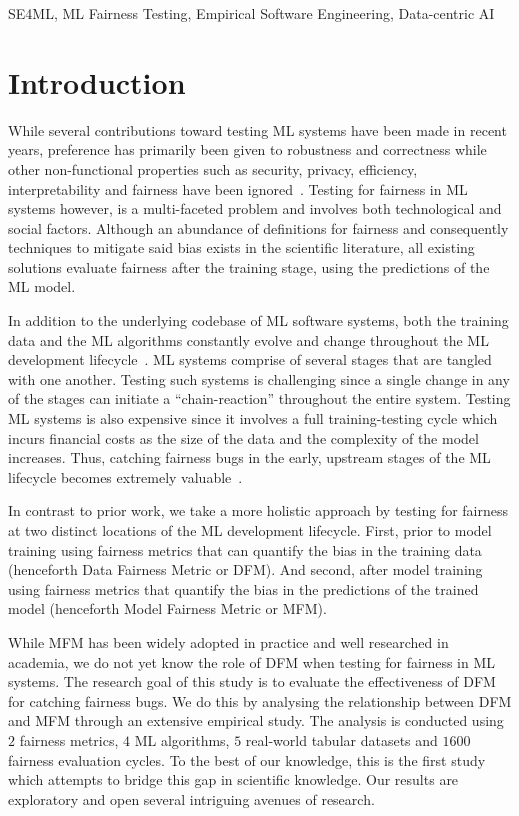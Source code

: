 \documentclass[conference,review,anonymous]{IEEEtran}
\begin{document}
\begin{IEEEkeywords} 
SE4ML, ML Fairness Testing, Empirical Software Engineering, Data-centric AI
\end{IEEEkeywords}

\section{Introduction}\label{sec:intro}

While several contributions toward testing ML systems have been made
in recent years, preference has primarily been given to robustness and
correctness while other non-functional properties such as security,
privacy, efficiency, interpretability and fairness have been
ignored \cite{zhang2020machine,zhang2021ignorance,mehrabi2021survey,wan2021modeling}. Testing
for fairness in ML systems however, is a multi-faceted problem and
involves both technological and social factors. Although an abundance
of definitions for fairness and consequently techniques to mitigate
said bias exists in the scientific literature, all existing solutions
evaluate fairness after the training stage, using the predictions of
the ML model.

In addition to the underlying codebase of ML software systems, both
the training data and the ML algorithms constantly evolve and change
throughout the ML development
lifecycle \cite{sculley2015hidden,bosch2021engineering,hutchinson2021towards}.
ML systems comprise of several stages that are tangled with one
another. Testing such systems is challenging since a single change in
any of the stages can initiate a ``chain-reaction'' throughout the
entire system. Testing ML systems is also expensive since it involves
a full training-testing cycle which incurs financial costs as the size
of the data and the complexity of the model increases. Thus, catching
fairness bugs in the early, upstream stages of the ML lifecycle
becomes extremely valuable \cite{shome2022data}.

In contrast to prior work, we take a more holistic approach by testing
for fairness at two distinct locations of the ML development
lifecycle. First, prior to model training using fairness metrics that
can quantify the bias in the training data (henceforth Data Fairness
Metric or DFM). And second, after model training using fairness
metrics that quantify the bias in the predictions of the trained model
(henceforth Model Fairness Metric or MFM).

While MFM has been widely adopted in practice and well researched in
academia, we do not yet know the role of DFM when testing for fairness
in ML systems. The research goal of this study is to evaluate the
effectiveness of DFM for catching fairness bugs. We do this by
analysing the relationship between DFM and MFM through an extensive
empirical study. The analysis is conducted using $2$ fairness metrics,
$4$ ML algorithms, $5$ real-world tabular datasets and $1600$ fairness
evaluation cycles. To the best of our knowledge, this is the first
study which attempts to bridge this gap in scientific knowledge. Our
results are exploratory and open several intriguing avenues of
research.
\end{document}
